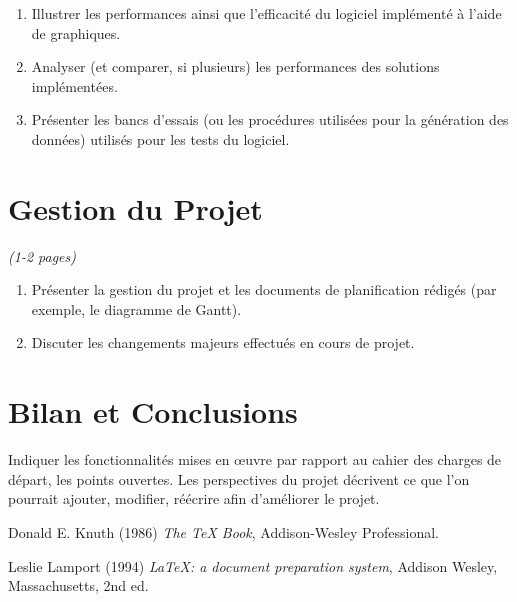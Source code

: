 \documentclass[a4paper]{article}
\begin{document}
\begin{enumerate}%
\item 	Illustrer les performances ainsi que l'efficacité du logiciel implémenté à l'aide de graphiques.
\item Analyser (et comparer, si plusieurs) les performances des solutions implémentées.
\item	Présenter les bancs d'essais (ou les procédures utilisées pour la génération des données) utilisés pour les tests du logiciel.
\end{enumerate}

\section{Gestion du Projet}
\emph{ (1-2 pages)}
\begin{enumerate}%
\item 	Présenter la gestion du projet et les documents de planification rédigés (par exemple, le diagramme de Gantt).
\item	Discuter les changements majeurs effectués en cours de projet. 
\end{enumerate}

\section{Bilan et Conclusions}

	Indiquer les fonctionnalités mises en œuvre par rapport au cahier des charges de départ, les points ouvertes.
	Les perspectives du projet décrivent ce que l’on pourrait ajouter, modifier, réécrire afin d’améliorer le projet. 
	
\begin{thebibliography}{9}
Donald E. Knuth (1986) \emph{The \TeX{} Book}, Addison-Wesley Professional.

Leslie Lamport (1994) \emph{\LaTeX: a document preparation system}, Addison
Wesley, Massachusetts, 2nd ed.
\end{thebibliography}
\end{document}

